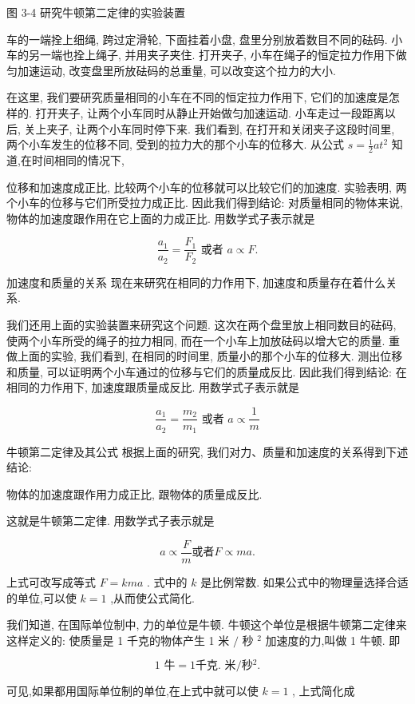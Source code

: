 \documentclass[10pt]{article}
\begin{document}
图 3-4 研究牛顿第二定律的实验装置

车的一端拴上细绳, 跨过定滑轮, 下面挂着小盘, 盘里分别放着数目不同的砝码. 小车的另一端也拴上绳子, 并用夹子夹住. 打开夹子, 小车在绳子的恒定拉力作用下做匀加速运动, 改变盘里所放砝码的总重量, 可以改变这个拉力的大小.

在这里, 我们要研究质量相同的小车在不同的恒定拉力作用下, 它们的加速度是怎样的. 打开夹子, 让两个小车同时从静止开始做匀加速运动. 小车走过一段距离以后, 关上夹子, 让两个小车同时停下来. 我们看到, 在打开和关闭夹子这段时间里, 两个小车发生的位移不同, 受到的拉力大的那个小车的位移大. 从公式 \(s = \frac{1}{2}a{t}^{2}\) 知道,在时间相同的情况下,

位移和加速度成正比, 比较两个小车的位移就可以比较它们的加速度. 实验表明, 两个小车的位移与它们所受拉力成正比. 因此我们得到结论: 对质量相同的物体来说, 物体的加速度跟作用在它上面的力成正比. 用数学式子表示就是

\[
\frac{{a}_{1}}{{a}_{2}} = \frac{{F}_{1}}{{F}_{2}}\text{ 或者 }a \propto F.
\]

加速度和质量的关系 现在来研究在相同的力作用下, 加速度和质量存在着什么关系.

我们还用上面的实验装置来研究这个问题. 这次在两个盘里放上相同数目的砝码, 使两个小车所受的绳子的拉力相同, 而在一个小车上加放砝码以增大它的质量. 重做上面的实验, 我们看到, 在相同的时间里, 质量小的那个小车的位移大. 测出位移和质量, 可以证明两个小车通过的位移与它们的质量成反比. 因此我们得到结论: 在相同的力作用下, 加速度跟质量成反比. 用数学式子表示就是

\[
\frac{{a}_{1}}{{a}_{2}} = \frac{{m}_{2}}{{m}_{1}}\text{ 或者 }a \propto \frac{1}{m}
\]

牛顿第二定律及其公式 根据上面的研究, 我们对力、质量和加速度的关系得到下述结论:

物体的加速度跟作用力成正比, 跟物体的质量成反比.

这就是牛顿第二定律. 用数学式子表示就是

\[
a \propto \frac{F}{m}\text{或者}F \propto {ma}\text{.}
\]

上式可改写成等式 \(F = {kma}\) . 式中的 \(k\) 是比例常数. 如果公式中的物理量选择合适的单位,可以使 \(k = 1\) ,从而使公式简化.

我们知道, 在国际单位制中, 力的单位是牛顿. 牛顿这个单位是根据牛顿第二定律来这样定义的: 使质量是 1 千克的物体产生 1 米 \(/\) 秒 \({}^{2}\) 加速度的力,叫做 1 牛顿. 即

\[
\text{1 牛} = 1\text{千克. 米}/秒{}^{2}\text{.}
\]

可见,如果都用国际单位制的单位,在上式中就可以使 \(k = 1\) , 上式简化成
\end{document}
